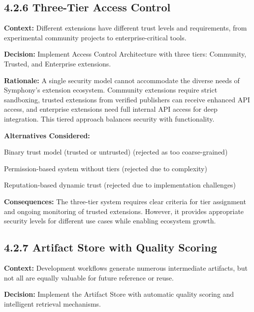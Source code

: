 \subsection*{4.2.6 Three-Tier Access Control}

\textbf{Context:} Different extensions have different trust levels and requirements, from experimental community projects to enterprise-critical tools.

\textbf{Decision:} Implement Access Control Architecture with three tiers: Community, Trusted, and Enterprise extensions.

\textbf{Rationale:} A single security model cannot accommodate the diverse needs of Symphony's extension ecosystem. Community extensions require strict sandboxing, trusted extensions from verified publishers can receive enhanced API access, and enterprise extensions need full internal API access for deep integration. This tiered approach balances security with functionality.

\textbf{Alternatives Considered:}
\begin{compactlist}
    \item Binary trust model (trusted or untrusted) (rejected as too coarse-grained)
    \item Permission-based system without tiers (rejected due to complexity)
    \item Reputation-based dynamic trust (rejected due to implementation challenges)
\end{compactlist}

\textbf{Consequences:} The three-tier system requires clear criteria for tier assignment and ongoing monitoring of trusted extensions. However, it provides appropriate security levels for different use cases while enabling ecosystem growth.

\subsection*{4.2.7 Artifact Store with Quality Scoring}

\textbf{Context:} Development workflows generate numerous intermediate artifacts, but not all are equally valuable for future reference or reuse.

\textbf{Decision:} Implement the Artifact Store with automatic quality scoring and intelligent retrieval mechanisms.

